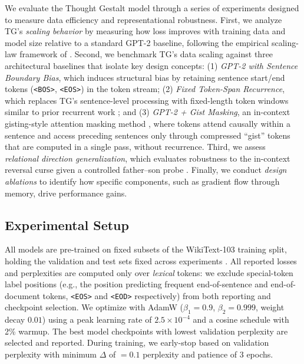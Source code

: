 \documentclass{article}
\begin{document}
We evaluate the Thought Gestalt model through a series of experiments designed to measure data efficiency and representational robustness. First, we analyze TG's \emph{scaling behavior} by measuring how loss improves with training data and model size relative to a standard GPT-2 baseline, following the empirical scaling-law framework of \citet{kaplan2020scaling}. Second, we benchmark TG's data scaling against three architectural baselines that isolate key design concepts: (1) \emph{GPT-2 with Sentence Boundary Bias}, which induces structural bias by retaining sentence start/end tokens (\texttt{<BOS>}, \texttt{<EOS>}) in the token stream; (2) \emph{Fixed Token-Span Recurrence}, which replaces TG's sentence-level processing with fixed-length token windows similar to prior recurrent work \citep{bulatov2022rmt, hutchins2022blockrecurrent}; and (3) \emph{GPT-2 + Gist Masking}, an in-context gisting-style attention masking method \citep{mu2023gisting}, where tokens attend causally within a sentence and access preceding sentences only through compressed ``gist'' tokens that are computed in a single pass, without recurrence. Third, we assess \emph{relational direction generalization}, which evaluates robustness to the in-context reversal curse given a controlled father--son probe \citep{berglund2024reversal,lin2024delving}. Finally, we conduct \emph{design ablations} to identify how specific components, such as gradient flow through memory, drive performance gains.

\subsection{Experimental Setup}
\label{sec:setup}
All models are pre-trained on fixed subsets of the WikiText-103 training split, holding the validation and test sets fixed across experiments \citep{merity2016pointer}. All reported losses and perplexities are computed only over \emph{lexical} tokens: we exclude special-token label positions (e.g., the position predicting frequent end-of-sentence and end-of-document tokens, \texttt{<EOS>} and \texttt{<EOD>} respectively) from both reporting and checkpoint selection. We optimize with AdamW ($\beta_1{=}0.9$, $\beta_2{=}0.999$, weight decay $0.01$) using a peak learning rate of $2.5\times10^{-4}$ and a cosine schedule with 2\% warmup. The best model checkpoints with lowest validation perplexity are selected and reported. During training, we early-stop based on validation perplexity with minimum  $\Delta$ of $=0.1$ perplexity and patience of $3$ epochs.
\end{document}
